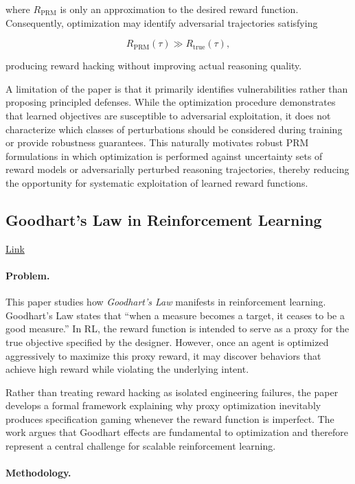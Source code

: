 \documentclass[11pt]{article}
\begin{document}
where \(R_{\mathrm{PRM}}\) is only an approximation to the desired reward function. Consequently, optimization may identify adversarial trajectories satisfying

\[
R_{\mathrm{PRM}}(\tau)
\gg
R_{\mathrm{true}}(\tau),
\]

producing reward hacking without improving actual reasoning quality.

A limitation of the paper is that it primarily identifies vulnerabilities rather than proposing principled defenses. While the optimization procedure demonstrates that learned objectives are susceptible to adversarial exploitation, it does not characterize which classes of perturbations should be considered during training or provide robustness guarantees. This naturally motivates robust PRM formulations in which optimization is performed against uncertainty sets of reward models or adversarially perturbed reasoning trajectories, thereby reducing the opportunity for systematic exploitation of learned reward functions.

\subsection{Goodhart's Law in Reinforcement Learning}

\href{https://arxiv.org/pdf/2310.09144}{Link}

\paragraph{Problem.}

This paper studies how \emph{Goodhart's Law} manifests in reinforcement learning. Goodhart's Law states that ``when a measure becomes a target, it ceases to be a good measure.'' In RL, the reward function is intended to serve as a proxy for the true objective specified by the designer. However, once an agent is optimized aggressively to maximize this proxy reward, it may discover behaviors that achieve high reward while violating the underlying intent.

Rather than treating reward hacking as isolated engineering failures, the paper develops a formal framework explaining why proxy optimization inevitably produces specification gaming whenever the reward function is imperfect. The work argues that Goodhart effects are fundamental to optimization and therefore represent a central challenge for scalable reinforcement learning.

\paragraph{Methodology.}
\end{document}
